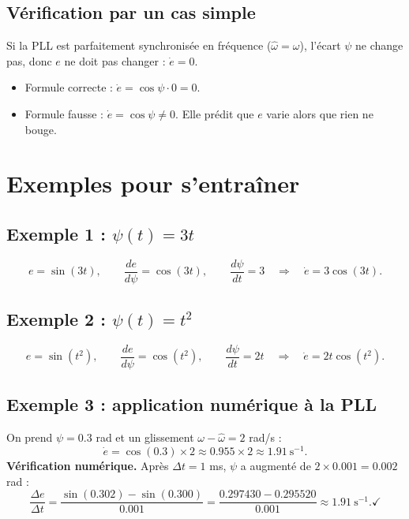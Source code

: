 \documentclass[11pt,a4paper]{article}
\numberwithin{equation}{section}
\newcommand{\hw}{\hat{\omega}}
\begin{document}
\subsection*{Vérification par un cas simple}
Si la PLL est parfaitement synchronisée en fréquence ($\hw=\omega$), l'écart $\psi$ ne change pas,
donc $e$ ne doit pas changer : $\dot e=0$.
\begin{itemize}
  \item Formule correcte : $\dot e = \cos\psi\cdot0 = 0$. \checkmark
  \item Formule fausse : $\dot e = \cos\psi\neq0$. Elle prédit que $e$ varie alors que rien ne bouge.
\end{itemize}

\section{Exemples pour s'entraîner}

\subsection*{Exemple 1 : $\psi(t)=3t$}
\begin{equation}
e = \sin(3t),\qquad \frac{de}{d\psi}=\cos(3t),\qquad \frac{d\psi}{dt}=3
\quad\Longrightarrow\quad \dot e = 3\cos(3t).
\end{equation}

\subsection*{Exemple 2 : $\psi(t)=t^2$}
\begin{equation}
e = \sin(t^2),\qquad \frac{de}{d\psi}=\cos(t^2),\qquad \frac{d\psi}{dt}=2t
\quad\Longrightarrow\quad \dot e = 2t\cos(t^2).
\end{equation}

\subsection*{Exemple 3 : application numérique à la PLL}
On prend $\psi=0.3$ rad et un glissement $\omega-\hw = 2$ rad/s :
\begin{equation}
\dot e = \cos(0.3)\times2 \approx 0.955\times2 \approx 1.91\ \text{s}^{-1}.
\end{equation}
\textbf{Vérification numérique.} Après $\Delta t = 1$ ms, $\psi$ a augmenté de $2\times0.001 = 0.002$ rad :
\begin{equation}
\frac{\Delta e}{\Delta t} = \frac{\sin(0.302)-\sin(0.300)}{0.001} = \frac{0.297430-0.295520}{0.001}\approx1.91\ \text{s}^{-1}. \checkmark
\end{equation}
\end{document}
